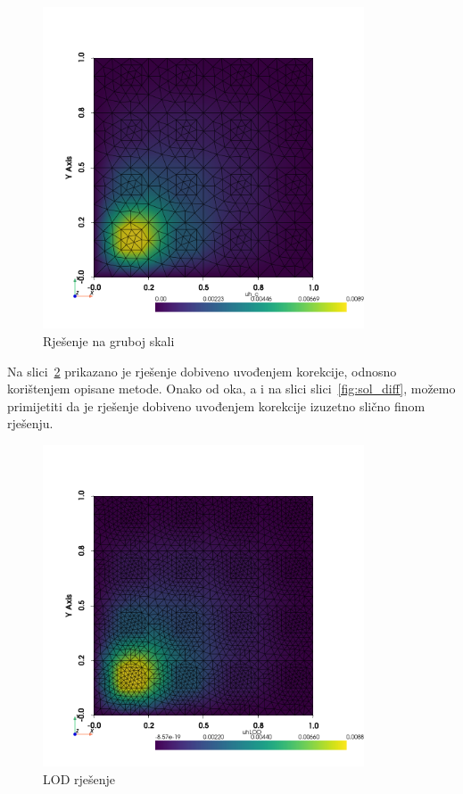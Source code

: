 \documentclass[zavrsnirad]{fer}
\begin{document}
\begin{figure}[h]
  \centering
  \includegraphics[width=0.85\textwidth]{Figures/solution_coarse.png}
  \caption{Rješenje na gruboj skali}
  \label{fig:sol_coarse}
\end{figure}

Na slici\ \ref{fig:sol_lod} prikazano je rješenje dobiveno uvođenjem korekcije,
odnosno korištenjem opisane metode. Onako od oka, a i na slici slici\ \ref{fig:sol_diff},
možemo primijetiti da je rješenje dobiveno uvođenjem korekcije izuzetno slično finom rješenju.

\begin{figure}[h]
  \centering
  \includegraphics[width=0.85\textwidth]{Figures/solution_lod.png}
  \caption{LOD rješenje}
  \label{fig:sol_lod}
\end{figure}
\end{document}
